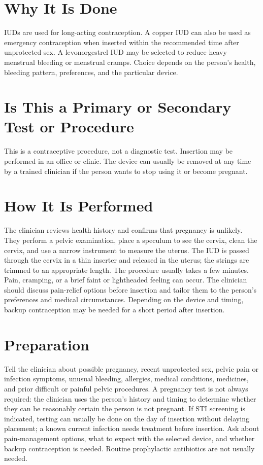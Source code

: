 \section*{Why It Is Done}
IUDs are used for long-acting contraception. A copper IUD can also be used as emergency contraception when inserted within the recommended time after unprotected sex. A levonorgestrel IUD may be selected to reduce heavy menstrual bleeding or menstrual cramps. Choice depends on the person's health, bleeding pattern, preferences, and the particular device.

\section*{Is This a Primary or Secondary Test or Procedure}
This is a contraceptive procedure, not a diagnostic test. Insertion may be performed in an office or clinic. The device can usually be removed at any time by a trained clinician if the person wants to stop using it or become pregnant.

\section*{How It Is Performed}
The clinician reviews health history and confirms that pregnancy is unlikely. They perform a pelvic examination, place a speculum to see the cervix, clean the cervix, and use a narrow instrument to measure the uterus. The IUD is passed through the cervix in a thin inserter and released in the uterus; the strings are trimmed to an appropriate length. The procedure usually takes a few minutes. Pain, cramping, or a brief faint or lightheaded feeling can occur. The clinician should discuss pain-relief options before insertion and tailor them to the person's preferences and medical circumstances. Depending on the device and timing, backup contraception may be needed for a short period after insertion.

\section*{Preparation}
Tell the clinician about possible pregnancy, recent unprotected sex, pelvic pain or infection symptoms, unusual bleeding, allergies, medical conditions, medicines, and prior difficult or painful pelvic procedures. A pregnancy test is not always required: the clinician uses the person's history and timing to determine whether they can be reasonably certain the person is not pregnant. If STI screening is indicated, testing can usually be done on the day of insertion without delaying placement; a known current infection needs treatment before insertion. Ask about pain-management options, what to expect with the selected device, and whether backup contraception is needed. Routine prophylactic antibiotics are not usually needed.

